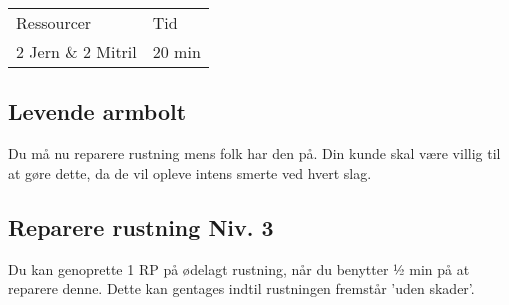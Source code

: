 \begin{table}[H]
    \centering
    \begin{tabular}{|p{}|p{}|}
    \hline
    \rowcolor{cerulean!80}
    \multicolumn{2}{c}{Lås Niv. 3}\\
    \hline
    \rowcolor{cerulean!40}
         Ressourcer & Tid \\\hline
         2 Jern \& 2 Mitril & 20 min\\\hline
    \end{tabular}
    \end{table}
    
\subsection{Levende armbolt}
Du må nu reparere rustning mens folk har den på. Din kunde skal være villig til at gøre dette, da de vil opleve intens smerte ved hvert slag.

\subsection{Reparere rustning Niv. 3}
Du kan genoprette 1 RP på ødelagt rustning, når du benytter ½ min på at reparere denne. Dette kan gentages indtil rustningen fremstår 'uden skader'.\\

